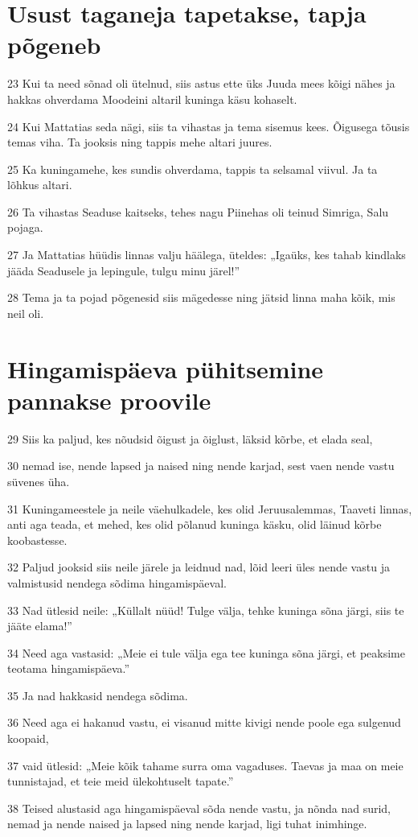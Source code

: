 \section*{Usust taganeja tapetakse, tapja põgeneb}

\par 23 Kui ta need sõnad oli ütelnud, siis astus ette üks Juuda mees kõigi nähes ja hakkas ohverdama Moodeini altaril kuninga käsu kohaselt.
\par 24 Kui Mattatias seda nägi, siis ta vihastas ja tema sisemus kees. Õigusega tõusis temas viha. Ta jooksis ning tappis mehe altari juures.
\par 25 Ka kuningamehe, kes sundis ohverdama, tappis ta selsamal viivul. Ja ta lõhkus altari.
\par 26 Ta vihastas Seaduse kaitseks, tehes nagu Piinehas oli teinud Simriga, Salu pojaga.
\par 27 Ja Mattatias hüüdis linnas valju häälega, üteldes: „Igaüks, kes tahab kindlaks jääda Seadusele ja lepingule, tulgu minu järel!”
\par 28 Tema ja ta pojad põgenesid siis mägedesse ning jätsid linna maha kõik, mis neil oli. 

\section*{Hingamispäeva pühitsemine pannakse proovile}

\par 29 Siis ka paljud, kes nõudsid õigust ja õiglust, läksid kõrbe, et elada seal,
\par 30 nemad ise, nende lapsed ja naised ning nende karjad, sest vaen nende vastu süvenes üha.
\par 31 Kuningameestele ja neile väehulkadele, kes olid Jeruusalemmas, Taaveti linnas, anti aga teada, et mehed, kes olid põlanud kuninga käsku, olid läinud kõrbe koobastesse.
\par 32 Paljud jooksid siis neile järele ja leidnud nad, lõid leeri üles nende vastu ja valmistusid nendega sõdima hingamispäeval.
\par 33 Nad ütlesid neile: „Küllalt nüüd! Tulge välja, tehke kuninga sõna järgi, siis te jääte elama!”
\par 34 Need aga vastasid: „Meie ei tule välja ega tee kuninga sõna järgi, et peaksime teotama hingamispäeva.”
\par 35 Ja nad hakkasid nendega sõdima.
\par 36 Need aga ei hakanud vastu, ei visanud mitte kivigi nende poole ega sulgenud koopaid,
\par 37 vaid ütlesid: „Meie kõik tahame surra oma vagaduses. Taevas ja maa on meie tunnistajad, et teie meid ülekohtuselt tapate.”
\par 38 Teised alustasid aga hingamispäeval sõda nende vastu, ja nõnda nad surid, nemad ja nende naised ja lapsed ning nende karjad, ligi tuhat inimhinge. 

